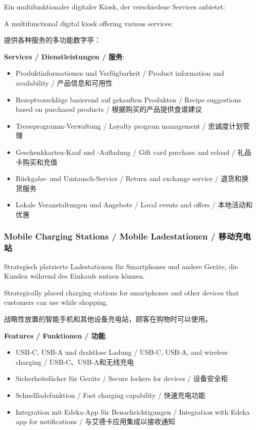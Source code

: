 \begin{otherlanguage}{ngerman}
Ein multifunktionaler digitaler Kiosk, der verschiedene Services anbietet:
\end{otherlanguage}

A multifunctional digital kiosk offering various services:

提供各种服务的多功能数字亭：

\textbf{Services / Dienstleistungen / 服务}:
\begin{itemize}
    \item Produktinformationen und Verfügbarkeit / Product information and availability / 产品信息和可用性
    \item Rezeptvorschläge basierend auf gekauften Produkten / Recipe suggestions based on purchased products / 根据购买的产品提供食谱建议
    \item Treueprogramm-Verwaltung / Loyalty program management / 忠诚度计划管理
    \item Geschenkkarten-Kauf und -Aufladung / Gift card purchase and reload / 礼品卡购买和充值
    \item Rückgabe- und Umtausch-Service / Return and exchange service / 退货和换货服务
    \item Lokale Veranstaltungen und Angebote / Local events and offers / 本地活动和优惠
\end{itemize}

\subsubsection{Mobile Charging Stations / Mobile Ladestationen / 移动充电站}

\begin{otherlanguage}{ngerman}
Strategisch platzierte Ladestationen für Smartphones und andere Geräte, die Kunden während des Einkaufs nutzen können.
\end{otherlanguage}

Strategically placed charging stations for smartphones and other devices that customers can use while shopping.

战略性放置的智能手机和其他设备充电站，顾客在购物时可以使用。

\textbf{Features / Funktionen / 功能}:
\begin{itemize}
    \item USB-C, USB-A und drahtlose Ladung / USB-C, USB-A, and wireless charging / USB-C、USB-A和无线充电
    \item Sicherheitsfächer für Geräte / Secure lockers for devices / 设备安全柜
    \item Schnellladefunktion / Fast charging capability / 快速充电功能
    \item Integration mit Edeka-App für Benachrichtigungen / Integration with Edeka app for notifications / 与艾德卡应用集成以接收通知
\end{itemize}

